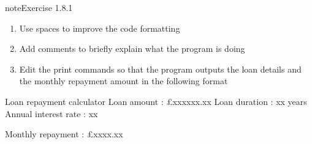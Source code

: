 \documentclass[letterpaper,10pt,english]{jupyterBook}
\begin{document}
\begin{sphinxadmonition}{note}{Exercise 1.8.1}
\begin{enumerate}
\item {} 
\sphinxAtStartPar
Use spaces to improve the code formatting

\item {} 
\sphinxAtStartPar
Add comments to briefly explain what the program is doing

\item {} 
\sphinxAtStartPar
Edit the print commands so that the program outputs the loan details and the monthly repayment amount in the following format

\end{enumerate}

\begin{sphinxVerbatim}[commandchars=\\\{\}]
Loan repayment calculator
\PYGZhy{}\PYGZhy{}\PYGZhy{}\PYGZhy{}\PYGZhy{}\PYGZhy{}\PYGZhy{}\PYGZhy{}\PYGZhy{}\PYGZhy{}\PYGZhy{}\PYGZhy{}\PYGZhy{}\PYGZhy{}\PYGZhy{}\PYGZhy{}\PYGZhy{}\PYGZhy{}\PYGZhy{}\PYGZhy{}\PYGZhy{}\PYGZhy{}\PYGZhy{}\PYGZhy{}\PYGZhy{}
Loan amount          : £xxxxxx.xx
Loan duration        : xx years
Annual interest rate : xx\PYGZpc{}

Monthly repayment    : £xxxx.xx
\end{sphinxVerbatim}
\end{sphinxadmonition}







\renewcommand{\indexname}{Index}
\printindex
\end{document}
